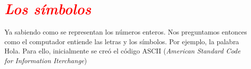 \documentclass[12pt]{article}
\begin{document}


\section*{\textcolor{red}{\textit{ Los símbolos}}}

Ya sabiendo como se representan los números enteros. Nos preguntamos entonces como el 
computador entiende las letras y los símbolos. Por ejemplo, la palabra Hola.
Para ello, inicialmente se creó el código 
ASCII ({\it American Standard Code for Information Iterchange})
\end{document}
